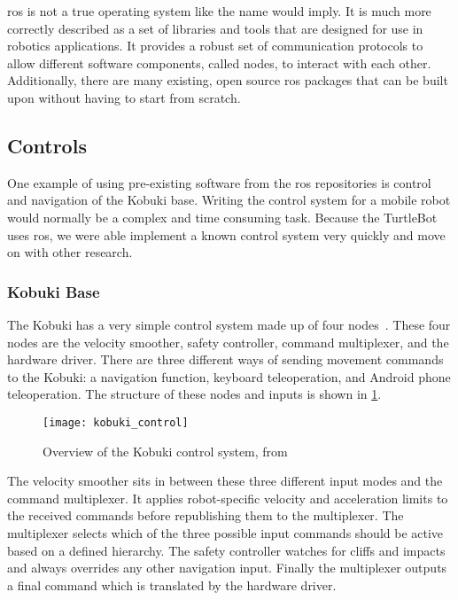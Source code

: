 \documentclass[thesis.tex]{subfile}
\begin{document}
\gls{ros} is not a true operating system like the name would imply. It is much more correctly described as a set of libraries and tools that are designed for use in robotics applications. It provides a robust set of communication protocols to allow different software components, called \glspl{node}, to interact with each other. Additionally, there are many existing, open source \gls{ros} packages that can be built upon without having to start from scratch.

\subsection{Controls} \label{sec:controls}
One example of using pre-existing software from the \gls{ros} repositories is control and navigation of the Kobuki base. Writing the control system for a mobile robot would normally be a complex and time consuming task. Because the TurtleBot uses \gls{ros}, we were able implement a known control system very quickly and move on with other research.

\subsubsection{Kobuki Base}
The Kobuki has a very simple control system made up of four \glspl{node}~\cite{KobukiControl}. These four \glspl{node} are the velocity smoother, safety controller, command multiplexer, and the hardware driver. There are three different ways of sending movement commands to the Kobuki: a navigation function, keyboard teleoperation, and Android phone teleoperation. The structure of these nodes and inputs is shown in \cref{fig:kobuki_control}.

\begin{figure}[htbp]
\texttt{[image: kobuki\_control]}
\caption[Overview of the Kobuki control system]{Overview of the Kobuki control system, from~\cite{KobukiControl}}
\label{fig:kobuki_control}
\end{figure}

The velocity smoother sits in between these three different input modes and the command multiplexer. It applies robot-specific velocity and acceleration limits to the received commands before republishing them to the multiplexer. The multiplexer selects which of the three possible input commands should be active based on a defined hierarchy. The safety controller watches for cliffs and impacts and always overrides any other navigation input. Finally the multiplexer outputs a final command which is translated by the hardware driver.
 
\end{document}

